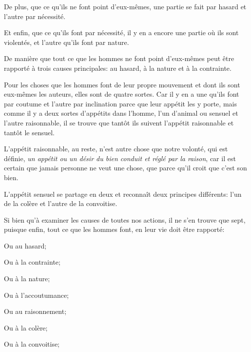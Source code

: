 De plus, que ce qu'ils ne font point d'eux-mêmes, une partie se fait par hasard et l'autre par nécessité.

Et enfin, que ce qu'ils font par nécessité, il y en a encore une partie où ils sont violentés, et l'autre qu'ils font par nature.

De manière que tout ce que les hommes ne font point d'eux-mêmes peut être rapporté à trois causes principales: au hasard, à la
nature et à la contrainte.

\bigbreak

Pour les choses que les hommes font de leur propre mouvement et dont ils sont eux-mêmes les auteurs, elles sont de quatre
sortes. Car il y en a une qu'ils font par coutume et l'autre par inclination parce que leur appétit les y porte, mais
comme il y a deux sortes d'appétits dans l'homme, l'un d'animal ou sensuel et l'autre raisonnable, il se trouve que tantôt
ils suivent l'appétit raisonnable et tantôt le sensuel.

L'appétit raisonnable, au reste, n'est autre chose que notre volonté, qui est définie, \emph{un appétit ou un désir du bien
conduit et réglé par la raison}, car il est certain que jamais personne ne veut une chose, que parce qu'il croit que c'est
son bien. 

L'appétit sensuel se partage en deux et reconnaît deux principes différents: l'un de la colère et l'autre de la convoitise.

\bigbreak

Si bien qu'à examiner les causes de toutes nos actions, il ne s'en trouve que sept, puisque enfin, tout ce que les hommes
font, en leur vie doit être rapporté:

\begin{emphpar}
	Ou au hasard;

	Ou à la contrainte;

	Ou à la nature;

	Ou à l'accoutumance;

	Ou au raisonnement;

	Ou à la colère;

	Ou à la convoitise;
\end{emphpar}

